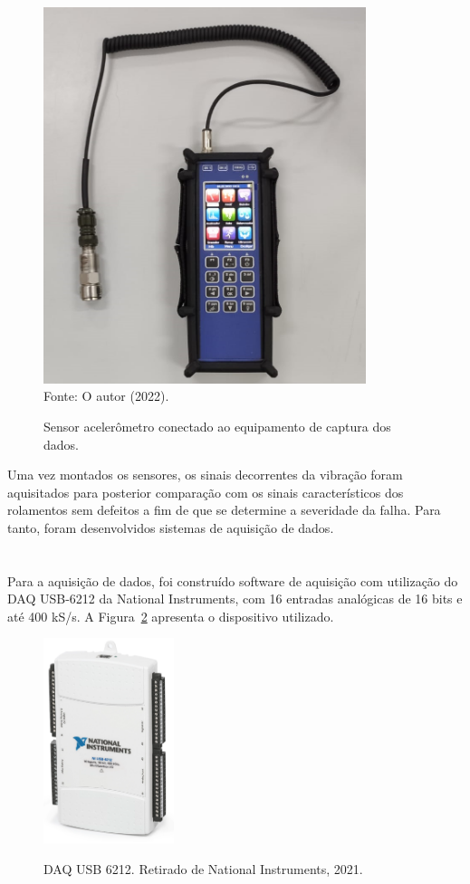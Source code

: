 \documentclass[
	12pt,				
	oneside,			
	a4paper,			
	english,			
	brazil,			
	]{abntex2ppgsi}
\begin{document}
\begin{figure}[H]
\centering
\caption {Sensor acelerômetro conectado ao equipamento de captura dos dados.}
\includegraphics[width=\textwidth,height=110mm,keepaspectratio]{adash} \\
Fonte: O autor (2022).
\label{adash}
\end{figure} 

Uma vez montados os sensores, os sinais decorrentes da vibração foram aquisitados para posterior comparação com os sinais característicos dos rolamentos sem defeitos a fim de que se determine a severidade da falha. Para tanto, foram desenvolvidos sistemas de aquisição de dados. 

\section{}

Para a aquisição de dados, foi construído software de aquisição com utilização do DAQ USB-6212 da National Instruments, com 16 entradas analógicas de 16 bits e até 400 kS/s. A Figura~\ref{USB6212} apresenta o dispositivo utilizado.

\begin{figure}[H]
\centering
\caption {DAQ USB 6212. Retirado de National Instruments, 2021.}
\includegraphics[width=\textwidth,height=60mm,keepaspectratio]{USB6212}
\label{USB6212}
\end{figure}
\end{document}
